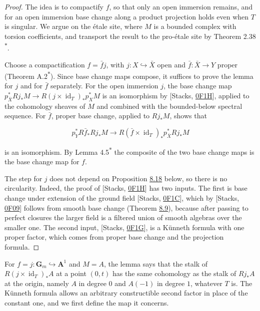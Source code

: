 \documentclass[11pt]{article}
\newcommand{\bpout}[1]{#1\textsuperscript{\hyperlink{bp-outside}{\ensuremath{\ast}}}}
\begin{document}
\begin{proof}[{Proof}]\label{bp52}%
The idea is to compactify \(f\), so that only an open immersion remains, and for an open immersion base change along a product projection holds even when \(T\) is singular. We argue on the étale site, where \(M\) is a bounded complex with torsion coefficients, and transport the result to the pro-étale site by Theorem \bpout{2.38}.

Choose a compactification \(f=\bar f j\), with \(j:X\hookrightarrow\bar X\) open and \(\bar f:\bar X\to Y\) proper (Theorem \bpout{A.2}). Since base change maps compose, it suffices to prove the lemma for \(j\) and for \(\bar f\) separately. For the open immersion \(j\), the base change map \(p_{\bar X}^*Rj_*M\to R(j\times\operatorname{id}_T)_*p_X^*M\) is an isomorphism by [Stacks, \href{https://stacks.math.columbia.edu/tag/0F1H}{0F1H}], applied to the cohomology sheaves of \(M\) and combined with the bounded-below spectral sequence. For \(\bar f\), proper base change, applied to \(Rj_*M\), shows that

\[
p_Y^*R\bar f_*Rj_*M\longrightarrow
R(\bar f\times\operatorname{id}_T)_*p_{\bar X}^*Rj_*M
\]

is an isomorphism. By Lemma \bpout{4.5} the composite of the two base change maps is the base change map for \(f\).

The step for \(j\) does not depend on Proposition \hyperref[bp64]{8.18} below, so there is no circularity. Indeed, the proof of [Stacks, \href{https://stacks.math.columbia.edu/tag/0F1H}{0F1H}] has two inputs. The first is base change under extension of the ground field [Stacks, \href{https://stacks.math.columbia.edu/tag/0F1C}{0F1C}], which by [Stacks, \href{https://stacks.math.columbia.edu/tag/0F09}{0F09}] follows from smooth base change (Theorem \hyperref[bp38]{8.9}), because after passing to perfect closures the larger field is a filtered union of smooth algebras over the smaller one. The second input, [Stacks, \href{https://stacks.math.columbia.edu/tag/0F1G}{0F1G}], is a Künneth formula with one proper factor, which comes from proper base change and the projection formula.
\end{proof}

\label{bp53}%
For \(f=j:\mathbf G_m\hookrightarrow\mathbf A^1\) and \(M=A\), the lemma says that the stalk of \(R(j\times\operatorname{id}_T)_*A\) at a point \((0,t)\) has the same cohomology as the stalk of \(Rj_*A\) at the origin, namely \(A\) in degree \(0\) and \(A(-1)\) in degree \(1\), whatever \(T\) is. The Künneth formula allows an arbitrary constructible second factor in place of the constant one, and we first define the map it concerns.
\end{document}

